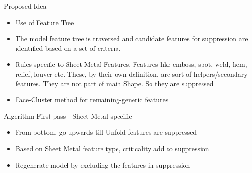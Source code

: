 
\begin{frame}{Proposed Idea}

\begin{itemize}[noitemsep,label=\textbullet,topsep=2pt,parsep=2pt,partopsep=2pt]
\item Use of Feature Tree
\item The model feature tree is traversed and candidate features for suppression are identified based on a set of criteria. 
\item Rules specific to Sheet Metal Features. Features like emboss, spot, weld, hem, relief, louver etc. These, by their own definition, are sort-of helpers/secondary features. They are not part of main Shape. So they are suppressed
\item Face-Cluster method for remaining-generic features
\end{itemize}
\end{frame}


\begin{frame}{Algorithm  First pass - Sheet Metal specific}

	\begin{itemize}[noitemsep,label=\textbullet,topsep=2pt,parsep=2pt,partopsep=2pt]
	\item From bottom, go upwards till Unfold features are suppressed
	\item Based on Sheet Metal feature type, criticality add to suppression
	\item Regenerate model by excluding the features in suppression
	\end{itemize}
\end{frame}

